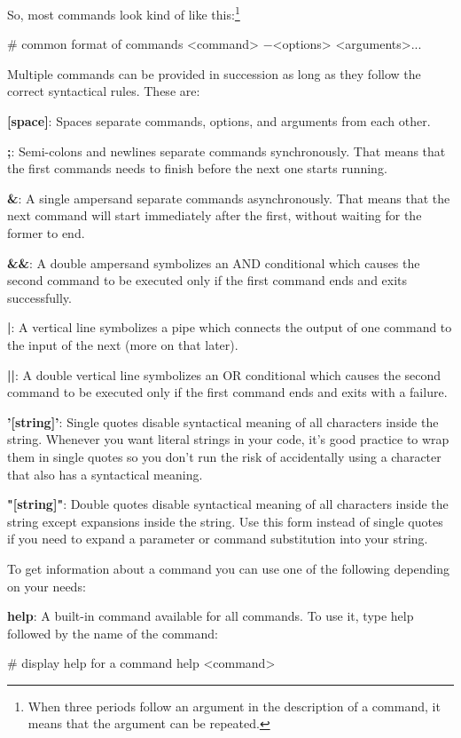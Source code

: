 So, most commands look kind of like this:\footnote{When three periods follow an argument in the description of a
command, it means that the argument can be repeated.}
\begin{bash}
# common format of commands
<command> $-$<options> <arguments>...
\end{bash}

Multiple commands can be provided in succession as long as they follow the correct syntactical rules. These are:
\bit
\item \textbf{[space]}: Spaces separate commands, options, and arguments from each other.
\item \textbf{;}: Semi-colons and newlines separate commands synchronously. That means that the first commands needs to
finish before the next one starts running.
\item \textbf{\&}: A single ampersand separate commands asynchronously. That means that the next command will start
immediately after the first, without waiting for the former to end.
\item \textbf{\&\&}: A double ampersand symbolizes an AND conditional which causes the second command to be executed
only
if the first command ends and exits successfully.
\item \textbf{|}: A vertical line symbolizes a pipe which connects the output of one command to the input of the next
(more on that later).
\item \textbf{||}: A double vertical line symbolizes an OR conditional which causes the second command to be executed
only if the first command ends and exits with a failure.
\item \textbf{'[string]'}: Single quotes disable syntactical meaning of all characters inside the string. Whenever you
want literal strings in your code, it's good practice to wrap them in single quotes so you don't run the risk of
accidentally using a character that also has a syntactical meaning.
\item \textbf{"[string]"}: Double quotes disable syntactical meaning of all characters inside the string except
expansions inside the string. Use this form instead of single quotes if you need to expand a parameter or command
substitution into your string.
\eit

To get information about a command you can use one of the following depending on your needs:
\bit
\item \textbf{help}: A built-in command available for all commands. To use it, type help followed by the name
of the command:
\begin{bash}
# display help for a command
help <command>
\end{bash}

